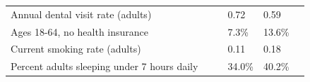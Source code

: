 \documentclass[9pt]{report}
\begin{document}
\begin{tabular}{p{.10in}p{.10in}p{.10in}p{3.7in}>{\hfill}p{.85in}>{\hfill}p{.85in}>{\hfill}p{.85in}>{\hfill}p{.85in}p{0.1in}}
\multicolumn{4}{l}{\parbox{3.6in}{\strut\raggedright{{Annual dental visit rate (adults)}}\strut}} &  &  & 0.72 & 0.59 & \multicolumn{1}{l}{}  \\ 
\multicolumn{4}{l}{\parbox{3.6in}{\strut\raggedright{{Ages 18-64, no health insurance}}\strut}} &  &  & 7.3\% & 13.6\% & \multicolumn{1}{l}{}  \\ 
\multicolumn{4}{l}{\parbox{3.6in}{\strut\raggedright{{Current smoking rate (adults)}}\strut}} &  &  & 0.11 & 0.18 & \multicolumn{1}{l}{}  \\ 
\multicolumn{4}{l}{\parbox{3.6in}{\strut\raggedright{{Percent adults sleeping under 7 hours daily}}\strut}} &  &  & 34.0\% & 40.2\% & \multicolumn{1}{l}{}  \\ 

\end{tabular}
\setlength{\tabcolsep}{6pt} %


\vspace{36pt}
\linespread{1.5}
\theendnotes
\end{document}
